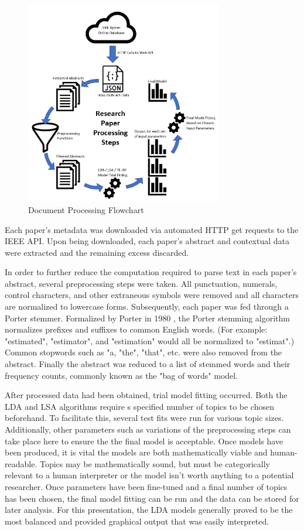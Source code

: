 \documentclass[conference]{IEEEtran}
\begin{document}
\begin{figure}
	\centering
	\includegraphics[width=3.4in]{flowchart.png}
	\caption{Document Processing Flowchart}
	\label{fig:flowchart}
\end{figure}

Each paper's metadata was downloaded via automated HTTP get requests to the IEEE API. Upon being downloaded, each paper's abstract and contextual data were extracted and the remaining excess discarded.

In order to further reduce the computation required to parse text in each paper's abstract, several preprocessing steps were taken. All punctuation, numerals, control characters, and other extraneous symbols were removed and all characters are normalized to lowercase forms. Subsequently, each paper was fed through a Porter stemmer. Formalized by Porter in 1980 \cite{porter1980algorithm}, the Porter stemming algorithm normalizes prefixes and suffixes to common English words. (For example: "estimated", "estimator", and "estimation" would all be normalized to "estimat".) Common stopwords such as "a, "the", "that", etc. were also removed from the abstract. Finally the abstract was reduced to a list of stemmed words and their frequency counts, commonly known as the "bag of words" model. 

After processed data had been obtained, trial model fitting occurred. Both the LDA and LSA algorithms require s specified number of topics to be chosen beforehand. To facilitate this, several test fits were run for various topic sizes. Additionally, other parameters such as variations of the preprocessing steps can take place here to ensure the the final model is acceptable. Once models have been produced, it is vital the models are both mathematically viable and human-readable. Topics may be mathematically sound, but must be categorically relevant to a human interpreter or the model isn't worth anything to a potential researcher. Once parameters have been fine-tuned and a final number of topics has been chosen, the final model fitting can be run and the data can be stored for later analysis. For this presentation, the LDA models generally proved to be the most balanced and provided graphical output that was easily interpreted.
\end{document}
